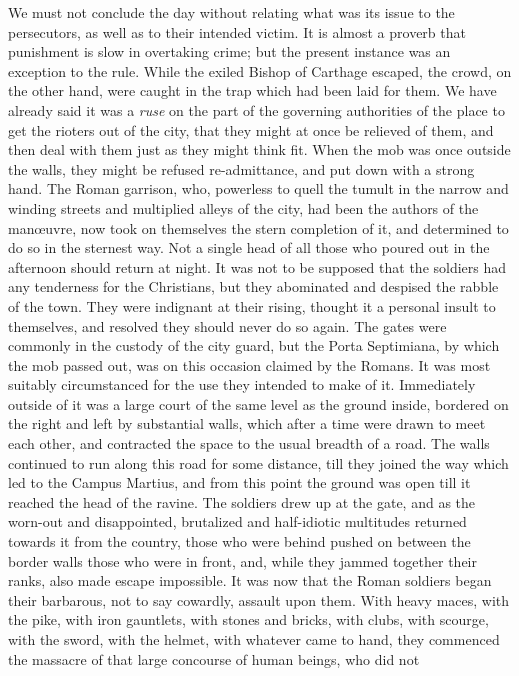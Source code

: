 We must not conclude the day without relating what was its issue to
the persecutors, as well as to their intended victim. It is almost a
proverb that punishment is slow in overtaking crime; but the present
instance was an exception to the rule. While the exiled Bishop of
Carthage escaped, the crowd, on the other hand, were caught in the
trap which had been laid for them. We have already said it was a \emph{ruse}
on the part of the governing authorities of the place to get the
rioters out of the city, that they might at once be relieved of them,
and then deal with them just as they might think fit. When the mob was
once outside the walls, they might be refused re-admittance, and put
down with a strong hand. The Roman garrison, who, powerless to quell
the tumult in the narrow and winding streets and multiplied alleys of
the city, had been the authors of the manœuvre, now took on
themselves the stern completion of it, and determined to do so in the
sternest way. Not a single head of all those who poured out in the
afternoon should return at night. It was not to be supposed that the
soldiers had any tenderness for the Christians, but they abominated
and despised the rabble of the town. They were indignant at their
rising, thought it a personal insult to themselves, and resolved they
should never do so again. The gates were commonly in the custody
of the city guard, but the Porta Septimiana, by which the mob passed
out, was on this occasion claimed by the Romans. It was most suitably
circumstanced for the use they intended to make of it. Immediately
outside of it was a large court of the same level as the ground
inside, bordered on the right and left by substantial walls, which
after a time were drawn to meet each other, and contracted the space
to the usual breadth of a road. The walls continued to run along this
road for some distance, till they joined the way which led to the
Campus Martius, and from this point the ground was open till it
reached the head of the ravine. The soldiers drew up at the gate, and
as the worn-out and disappointed, brutalized and half-idiotic
multitudes returned towards it from the country, those who were behind
pushed on between the border walls those who were in front, and, while
they jammed together their ranks, also made escape impossible. It was
now that the Roman soldiers began their barbarous, not to say
cowardly, assault upon them. With heavy maces, with the pike, with
iron gauntlets, with stones and bricks, with clubs, with scourge, with
the sword, with the helmet, with whatever came to hand, they commenced
the massacre of that large concourse of human beings, who did not
